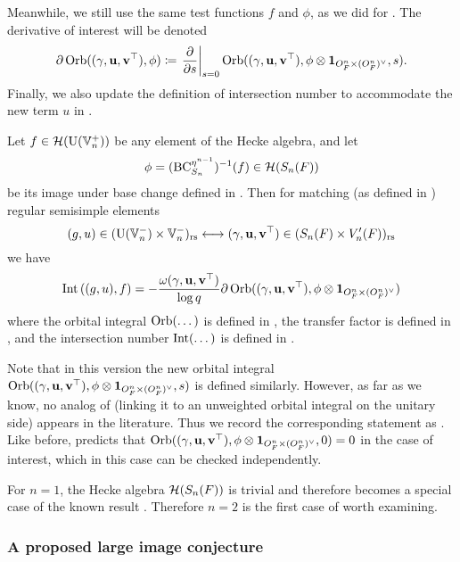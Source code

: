 Meanwhile, we still use the same test functions $f$ and $\phi$,
as we did for \cite[Conjecture 6.2.1]{ref:AFLspherical}.
The derivative of interest will be denoted
\[ \partial \operatorname{Orb}({(\gamma, \mathbf u, \mathbf v^\top)}, \phi) \coloneqq
  \left. \pdv{}{s} \right\rvert_{s=0}
  \operatorname{Orb}((\gamma, \mathbf u, \mathbf v^\top), \phi \otimes \mathbf{1}_{O_F^n \times (O_F^n)^\vee}, s). \]
Finally, we also update the definition of intersection number
to accommodate the new term $u$ in .
\begin{conjecture}
  Let $f \in \mathcal H(\operatorname{U}(\mathbb V_n^+))$ be any element of the Hecke algebra, and let
  \[ \phi = (\operatorname{BC}_{S_n}^{\eta^{n-1}})^{-1}(f) \in \mathcal H(S_n(F)) \]
  be its image under base change defined in .
  Then for matching (as defined in ) regular semisimple elements
  \[ (g, u) \in (\operatorname{U}(\mathbb V_n^-) \times \mathbb V_n^-)_{\mathrm{rs}} \longleftrightarrow
    {(\gamma, \mathbf u, \mathbf v^\top)} \in (S_n(F) \times V'_n(F))_{\mathrm{rs}} \]
  we have
  \begin{equation}
    \operatorname{Int}\left( (g,u), f \right) = -\frac{\omega{(\gamma, \mathbf u, \mathbf v^\top)}}{\log q} \partial \operatorname{Orb}({(\gamma, \mathbf u, \mathbf v^\top)}, \phi \otimes \mathbf{1}_{O_F^n \times (O_F^n)^\vee})
  \end{equation}
  where the orbital integral $\operatorname{Orb}(\dots)$ is defined in ,
  the transfer factor is defined in ,
  and the intersection number $\operatorname{Int}(\dots)$ is defined in .
  \label{conj:semi_lie_spherical}
\end{conjecture}
Note that in this version the new orbital integral $\operatorname{Orb}({(\gamma, \mathbf u, \mathbf v^\top)}, \phi \otimes \mathbf{1}_{O_F^n \times (O_F^n)^\vee}, s)$
is defined similarly.
However, as far as we know, no analog of 
(linking it to an unweighted orbital integral on the unitary side) appears in the literature.
Thus we record the corresponding statement as .
Like before, 
predicts that $\operatorname{Orb}({(\gamma, \mathbf u, \mathbf v^\top)}, \phi \otimes \mathbf{1}_{O_F^n \times (O_F^n)^\vee}, 0) = 0$ in the case of interest,
which in this case can be checked independently.

\begin{remark}
  For $n = 1$, the Hecke algebra $\mathcal H(S_n(F))$ is trivial
  and therefore 
  becomes a special case of the known result \cite{ref:liuFJ}.
  Therefore $n=2$ is the first case of  worth examining.
\end{remark}

\subsubsection{A proposed large image conjecture}
\label{sec:intro_large_kernel}

